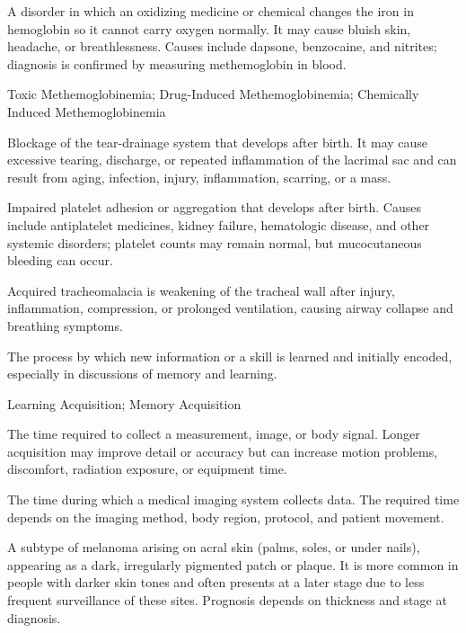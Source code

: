  A disorder in which an oxidizing medicine or chemical changes the iron in hemoglobin so it cannot carry oxygen normally. It may cause bluish skin, headache, or breathlessness. Causes include dapsone, benzocaine, and nitrites; diagnosis is confirmed by measuring methemoglobin in blood.

\synonyms
Toxic Methemoglobinemia; Drug-Induced Methemoglobinemia; Chemically Induced Methemoglobinemia

 Blockage of the tear-drainage system that develops after birth. It may cause excessive tearing, discharge, or repeated inflammation of the lacrimal sac and can result from aging, infection, injury, inflammation, scarring, or a mass.

 Impaired platelet adhesion or aggregation that develops after birth. Causes include antiplatelet medicines, kidney failure, hematologic disease, and other systemic disorders; platelet counts may remain normal, but mucocutaneous bleeding can occur.

 Acquired tracheomalacia is weakening of the tracheal wall after injury, inflammation, compression, or prolonged ventilation, causing airway collapse and breathing symptoms.

 The process by which new information or a skill is learned and initially encoded, especially in discussions of memory and learning.

\synonyms
Learning Acquisition; Memory Acquisition

 The time required to collect a measurement, image, or body signal. Longer acquisition may improve detail or accuracy but can increase motion problems, discomfort, radiation exposure, or equipment time.

 The time during which a medical imaging system collects data. The required time depends on the imaging method,
body region, protocol, and patient movement.

 A subtype of melanoma arising on acral skin (palms, soles, or under nails), appearing as
a dark, irregularly pigmented patch or plaque. It is more common in people with darker
skin tones and often presents at a later stage due to less frequent surveillance of
these sites. Prognosis depends on thickness and stage at diagnosis.

